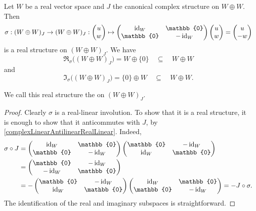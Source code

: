 \begin{lemma}
Let $W$ be a real vector space and $J$ the canonical complex structure on $W\oplus W$. Then
\[ \sigma: (W\oplus W)_J \to (W\oplus W)_J: \begin{pmatrix}
u \\ w
\end{pmatrix} \mapsto \begin{pmatrix}
\id_W & \mathbb{0} \\
\mathbb{0} & -\id_W
\end{pmatrix}\begin{pmatrix}
u \\ w
\end{pmatrix} = \begin{pmatrix}
u \\ -w
\end{pmatrix} \]
is a real structure on $(W\oplus W)_J$. We have
\[ \Re_\sigma\big((W\oplus W)_J\big) = W\oplus\{0\} \quad\subseteq\quad W\oplus W \]
and
\[ \Im_\sigma\big((W\oplus W)_J\big) = \{0\}\oplus W \quad\subseteq\quad W\oplus W. \]
\end{lemma}
We call this real structure the  on $(W\oplus W)_J$.
\begin{proof}
Clearly $\sigma$ is a real-linear involution. To show that it is a real structure, it is enough to show that it anticommutes with $J$, by \ref{complexLinearAntilinearRealLinear}. Indeed,
\begin{align*}
\sigma\circ J &= \begin{pmatrix}
\id_W & \mathbb{0} \\
\mathbb{0} & -\id_W
\end{pmatrix}\begin{pmatrix}
\mathbb{0} & -\id_W \\
\id_W & \mathbb{0}
\end{pmatrix} \\
&= \begin{pmatrix}
\mathbb{0} & -\id_W \\
-\id_W & \mathbb{0}
\end{pmatrix} \\
&= -\begin{pmatrix}
\mathbb{0} & -\id_W \\
\id_W & \mathbb{0}
\end{pmatrix}\begin{pmatrix}
\id_W & \mathbb{0} \\
\mathbb{0} & -\id_W
\end{pmatrix} = -J\circ \sigma.
\end{align*}
The identification of the real and imaginary subspaces is straightforward.
\end{proof}




